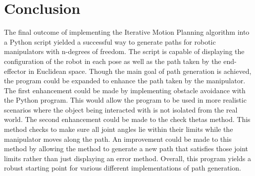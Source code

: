 \documentclass[11pt]{article}
\begin{document}
\section{Conclusion}
The final outcome of implementing the Iterative Motion Planning algorithm into a Python script yielded a successful way to generate paths for robotic manipulators with n-degrees of freedom. The script is capable of displaying the configuration of the robot in each pose as well as the path taken by the end-effector in Euclidean space. Though the main goal of path generation is achieved, the program could be expanded to enhance the path taken by the manipulator. The first enhancement could be made by implementing obstacle avoidance with the Python program. This would allow the program to be used in more realistic scenarios where the object being interacted with is not isolated from the real world. The second enhancement could be made to the check thetas method. This method checks to make sure all joint angles lie within their limits while the manipulator moves along the path. An improvement could be made to this method by allowing the method to generate a new path that satisfies those joint limits rather than just displaying an error method. Overall, this program yields a robust starting point for various different implementations of path generation.   
\end{document}
